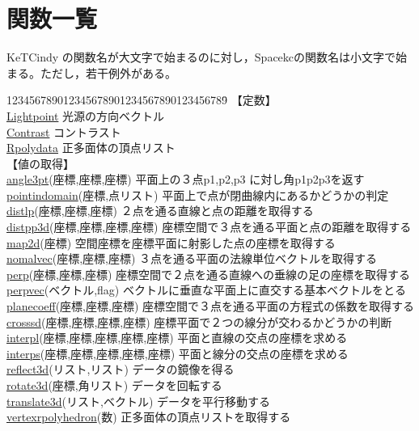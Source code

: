 \documentclass[papersize,a4paper,12pt,uplatex]{jsarticle}
\begin{document}
\hypertarget{functionlist}{}
\section{関数一覧}
KeTCindy の関数名が大文字で始まるのに対し，Spacekcの関数名は小文字で始まる。ただし，若干例外がある。\\

\begin{tabbing}
123456789012345678901234567890123456789\=\kill
【定数】\\
\hyperlink{lightpoint}{Lightpoint}       \> 光源の方向ベクトル\\
\hyperlink{contrast}{Contrast}       \> コントラスト\\
\hyperlink{rpolydata}{Rpolydata}       \> 正多面体の頂点リスト\\

【値の取得】\\
\hyperlink{angle3pt}{angle3pt}(座標,座標,座標) \>平面上の３点p1,p2,p3 に対し角p1p2p3を返す\\
\hyperlink{pointindomain}{pointindomain}(座標,点リスト) \> 平面上で点が閉曲線内にあるかどうかの判定\\
\hyperlink{distlp}{distlp}(座標,座標,座標)  \>２点を通る直線と点の距離を取得する\\
\hyperlink{distpp3d}{distpp3d}(座標,座標,座標,座標)  \>座標空間で３点を通る平面と点の距離を取得する\\
\hyperlink{map2d}{map2d}(座標) \>空間座標を座標平面に射影した点の座標を取得する\\
\hyperlink{nomalvec}{nomalvec}(座標,座標,座標) \>３点を通る平面の法線単位ベクトルを取得する\\
\hyperlink{perp}{perp}(座標,座標,座標)  \>座標空間で２点を通る直線への垂線の足の座標を取得する\\
\hyperlink{perpvec}{perpvec}(ベクトル,flag)  \>ベクトルに垂直な平面上に直交する基本ベクトルをとる\\
\hyperlink{planecoeff}{planecoeff}(座標,座標,座標)  \>座標空間で３点を通る平面の方程式の係数を取得する\\
\hyperlink{crosssd}{crosssd}(座標,座標,座標,座標) \>座標平面で２つの線分が交わるかどうかの判断\\
\hyperlink{interpl}{interpl}(座標,座標,座標,座標,座標) \>平面と直線の交点の座標を求める\\
\hyperlink{interps}{interps}(座標,座標,座標,座標,座標) \>平面と線分の交点の座標を求める\\
\hyperlink{reflect3d}{reflect3d}(リスト,リスト) \>データの鏡像を得る\\
\hyperlink{rotate3d}{rotate3d}(座標,角リスト) \>データを回転する\\
\hyperlink{translate3d}{translate3d}(リスト,ベクトル) \>データを平行移動する\\
\hyperlink{vertexrpolyhedron}{vertexrpolyhedron}(数) \>正多面体の頂点リストを取得する\\


\end{tabbing}
\end{document}
